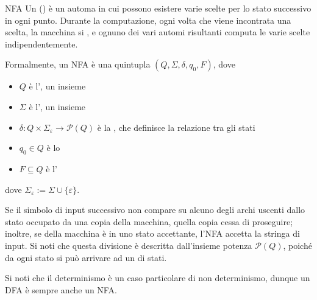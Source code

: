 \documentclass[a4paper, 12pt]{report}
\begin{document}
    \begin{frameddefn}{NFA}
        Un  () è un automa in cui possono esistere varie scelte per lo stato successivo in ogni punto. Durante la computazione, ogni volta che viene incontrata una scelta, la macchina si , e ognuno dei vari automi risultanti computa le varie scelte indipendentemente.

        Formalmente, un NFA è una quintupla $(Q, \Sigma, \delta, q_0, F)$, dove

        \begin{itemize}
            \item $Q$ è l', un insieme 
            \item $\Sigma$ è l', un insieme 
            \item $\delta: Q \times \Sigma_{\varepsilon} \rightarrow \mathcal{P}(Q)$ è la , che definisce la relazione tra gli stati
            \item $q_0 \in Q$ è lo 
            \item $F \subseteq Q$ è l'
        \end{itemize}

        dove $\Sigma_{\varepsilon} := \Sigma \cup \{\varepsilon\}$.

        Se il simbolo di input successivo non compare su alcuno degli archi uscenti dallo stato occupato da una copia della macchina, quella copia cessa di proseguire; inoltre, se  della macchina è in uno stato accettante, l'NFA accetta la stringa di input. Si noti che questa divisione è descritta dall'insieme potenza $\mathcal{P}(Q)$, poiché da ogni stato si può arrivare ad un  di stati.

        Si noti che il determinismo è un caso particolare di non determinismo, dunque un DFA è sempre anche un NFA.
    \end{frameddefn}
\end{document}

